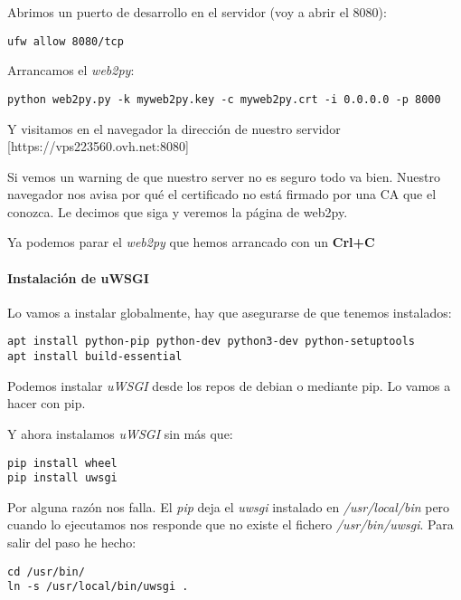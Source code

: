 \documentclass[12pt,spanish,]{article}
\let\oldparagraph\paragraph
\renewcommand{\paragraph}[1]{\oldparagraph{#1}\mbox{}}
\begin{document}
Abrimos un puerto de desarrollo en el servidor (voy a abrir el 8080):

\begin{verbatim}
ufw allow 8080/tcp
\end{verbatim}

Arrancamos el \emph{web2py}:

\begin{verbatim}
python web2py.py -k myweb2py.key -c myweb2py.crt -i 0.0.0.0 -p 8000
\end{verbatim}

Y visitamos en el navegador la dirección de nuestro servidor
{[}https://vps223560.ovh.net:8080{]}

Si vemos un warning de que nuestro server no es seguro todo va bien.
Nuestro navegador nos avisa por qué el certificado no está firmado por
una CA que el conozca. Le decimos que siga y veremos la página de
web2py.

Ya podemos parar el \emph{web2py} que hemos arrancado con un
\textbf{Crl+C}

\hypertarget{instalaciuxf3n-de-uwsgi}{%
\paragraph{Instalación de uWSGI}\label{instalaciuxf3n-de-uwsgi}}

Lo vamos a instalar globalmente, hay que asegurarse de que tenemos
instalados:

\begin{verbatim}
apt install python-pip python-dev python3-dev python-setuptools
apt install build-essential
\end{verbatim}

Podemos instalar \emph{uWSGI} desde los repos de debian o mediante pip.
Lo vamos a hacer con pip.

Y ahora instalamos \emph{uWSGI} sin más que:

\begin{verbatim}
pip install wheel
pip install uwsgi
\end{verbatim}

Por alguna razón nos falla. El \emph{pip} deja el \emph{uwsgi} instalado
en \emph{/usr/local/bin} pero cuando lo ejecutamos nos responde que no
existe el fichero \emph{/usr/bin/uwsgi}. Para salir del paso he hecho:

\begin{verbatim}
cd /usr/bin/
ln -s /usr/local/bin/uwsgi .
\end{verbatim}
\end{document}
